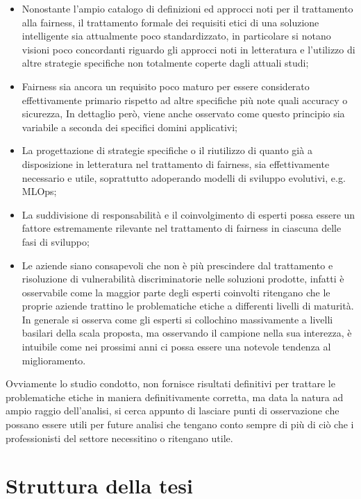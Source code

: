 \begin{itemize}
    \item Nonostante l'ampio catalogo di definizioni ed approcci noti per il trattamento alla fairness, il trattamento formale dei requisiti etici di una soluzione intelligente sia attualmente poco standardizzato, in particolare si notano visioni poco concordanti riguardo gli approcci noti in letteratura e l'utilizzo di altre strategie specifiche non totalmente coperte dagli attuali studi;
    \item Fairness sia ancora un requisito poco maturo per essere considerato effettivamente primario rispetto ad altre specifiche più note quali accuracy o sicurezza, In dettaglio però, viene anche osservato come questo principio sia variabile a seconda dei specifici domini applicativi;
    \item La progettazione di strategie specifiche o il riutilizzo di quanto già a disposizione in letteratura nel trattamento di fairness, sia effettivamente necessario e utile, soprattutto adoperando modelli di sviluppo evolutivi, e.g. MLOps;
    \item La suddivisione di responsabilità e il coinvolgimento di esperti possa essere un fattore estremamente rilevante nel trattamento di fairness in ciascuna delle fasi di sviluppo;
    \item Le aziende siano consapevoli che non è più prescindere dal trattamento e risoluzione di vulnerabilità discriminatorie nelle soluzioni prodotte, infatti è osservabile come la maggior parte degli esperti coinvolti ritengano che le proprie aziende trattino le problematiche etiche a differenti livelli di maturità. In generale si osserva come gli esperti si collochino massivamente a livelli basilari della scala proposta, ma osservando il campione nella sua interezza, è intuibile come nei prossimi anni ci possa essere una notevole tendenza al miglioramento. 
\end{itemize}
 
 Ovviamente lo studio condotto, non fornisce risultati definitivi per trattare le problematiche etiche in maniera definitivamente corretta, ma data la natura ad ampio raggio dell'analisi, si cerca appunto di lasciare punti di osservazione che possano essere utili per future analisi che tengano conto sempre di più di ciò che i professionisti del settore necessitino o ritengano utile.
\section{Struttura della tesi}

